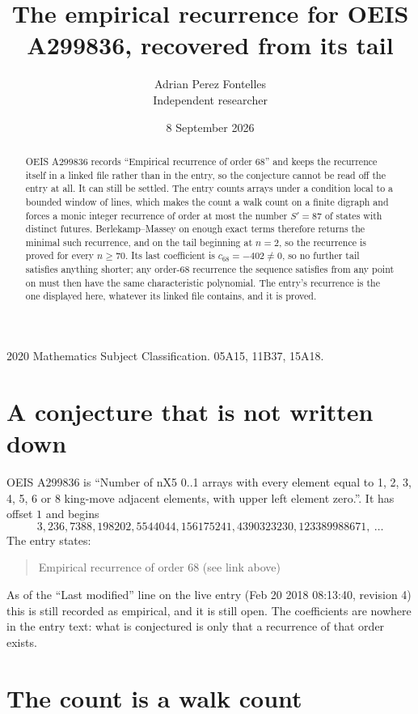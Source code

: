 \documentclass[11pt,a4paper]{article}
\title{The empirical recurrence for OEIS A299836, recovered from its tail}
\author{Adrian Perez Fontelles\\ \small Independent researcher}
\date{8 September 2026}
\theoremstyle{plain}
\theoremstyle{definition}
\begin{document}
\maketitle

\begin{abstract}
OEIS A299836 records ``Empirical recurrence of order $68$'' and keeps the recurrence itself in
a linked file rather than in the entry, so the conjecture cannot be read off the entry at all.
It can still be settled. The entry counts arrays under a condition local to a bounded window of
lines, which makes the count a walk count on a finite digraph and forces a monic integer
recurrence of order at most the number $S'=87$ of states with distinct futures. Berlekamp--Massey on
enough exact terms therefore returns the minimal such recurrence, and on the tail beginning at $n=2$, so the recurrence is proved for every $n\ge70$.
Its last coefficient is $c_{68}=-402\neq0$, so no further tail satisfies anything
shorter; any order-$68$ recurrence the sequence satisfies from any point on must then have
the same characteristic polynomial. The entry's recurrence is the one displayed here, whatever
its linked file contains, and it is proved.
\end{abstract}

\noindent\small 2020 Mathematics Subject Classification. 05A15, 11B37, 15A18.\normalsize

\section{A conjecture that is not written down}

OEIS A299836 is ``Number of nX5 0..1 arrays with every element equal to 1, 2, 3, 4, 5, 6 or 8 king-move adjacent elements, with upper left element zero.''. It has offset $1$ and begins
\[
3, 236, 7388, 198202, 5544044, 156175241, 4390323230, 123389988671,\ \dots
\]
The entry states:
\begin{quote}
Empirical recurrence of order 68 (see link above)
\end{quote}
As of the ``Last modified'' line on the live entry (Feb 20 2018 08:13:40, revision 4)
this is still recorded as empirical, and it is still open. The coefficients are nowhere in the
entry text: what is conjectured is only that a recurrence of that order exists.

\section{The count is a walk count}
\end{document}
